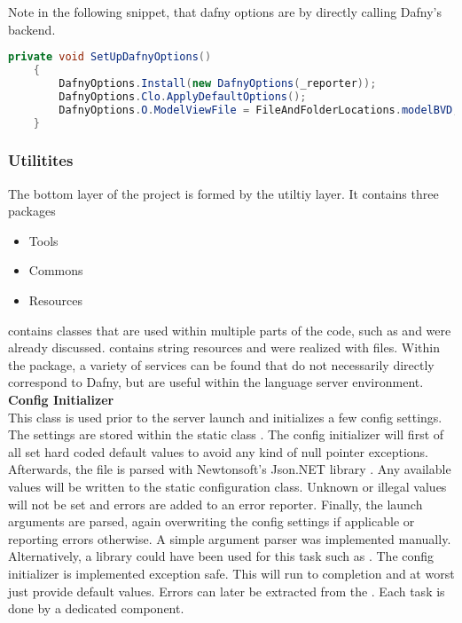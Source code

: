 Note in the following snippet, that dafny options are by directly calling Dafny's backend.
\begin{lstlisting}[language=csharp, caption={Setting up Dafny Options}, captionpos=b, label={lst:setupdafnyoptions}]
    private void SetUpDafnyOptions()
    {
        DafnyOptions.Install(new DafnyOptions(_reporter));
        DafnyOptions.Clo.ApplyDefaultOptions();
        DafnyOptions.O.ModelViewFile = FileAndFolderLocations.modelBVD;
    }
\end{lstlisting}





\subsubsection{Utilitites}
The bottom layer of the project is formed by the utiltiy layer.
It contains three packages
\begin{itemize}
    \item Tools
    \item Commons
    \item Resources
\end{itemize}
 contains classes that are used within multiple parts of the code, such as  and were already discussed.
 contains string resources and were realized with  files.
Within the  package,
a variety of services can be found that do not necessarily directly correspond to Dafny,
but are useful within the language server environment.\\

\textbf{Config Initializer}\\
This class is used prior to the server launch and initializes a few config settings.
The settings are stored within the static class .
The config initializer will first of all set hard coded default values to avoid any kind of null pointer exceptions.
Afterwards, the file  is parsed with Newtonsoft's Json.NET library \cite{jsondotnet}.
Any available values will be written to the static configuration class.
Unknown or illegal values will not be set and errors are added to an error reporter.
Finally, the launch arguments are parsed, again overwriting the config settings if applicable or reporting errors otherwise.
A simple argument parser was implemented manually.
Alternatively, a library could have been used for this task such as \cite{clparser}.
The config initializer is implemented exception safe.
This will run to completion and at worst just provide default values.
Errors can later be extracted from the .
Each task is done by a dedicated component.\\

